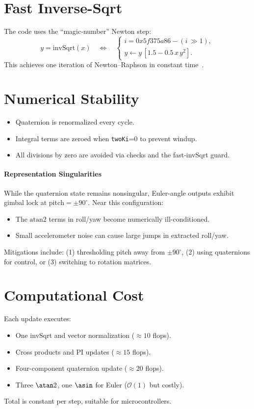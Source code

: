 \documentclass[12pt]{article}
\begin{document}
\section{Fast Inverse-Sqrt}
The code uses the “magic‐number” Newton step:
\[
y = \mathrm{invSqrt}(x)
\quad\Longleftrightarrow\quad
\begin{cases}
i = 0x5f375a86 - (i\,\gg1),\\
y \leftarrow y\,[1.5 - 0.5\,x\,y^2].
\end{cases}
\]
This achieves one iteration of Newton–Raphson in constant time~\cite{Quake2002}.

\section{Numerical Stability}
\begin{itemize}
  \item Quaternion is renormalized every cycle.
  \item Integral terms are zeroed when \texttt{twoKi}=0 to prevent windup.
  \item All divisions by zero are avoided via checks and the fast‐invSqrt guard.
\end{itemize}

\paragraph{Representation Singularities}  
While the quaternion state remains nonsingular, Euler-angle outputs exhibit gimbal lock at $\mathrm{pitch} = \pm90^\circ$. Near this configuration:  
\begin{itemize}  
  \item The $\mathrm{atan2}$ terms in roll/yaw become numerically ill-conditioned.  
  \item Small accelerometer noise can cause large jumps in extracted roll/yaw.  
\end{itemize}  
Mitigations include: (1) thresholding pitch away from $\pm90^\circ$, (2) using quaternions for control, or (3) switching to rotation matrices.

\section{Computational Cost}
Each update executes:
\begin{itemize}
  \item One invSqrt and vector normalization (\(\approx10\) flops).
  \item Cross products and PI updates (\(\approx15\) flops).
  \item Four-component quaternion update (\(\approx20\) flops).
  \item Three \(\atan2\), one \(\asin\) for Euler (\(\mathcal O(1)\) but costly).
\end{itemize}
Total is constant per step, suitable for microcontrollers.
\end{document}

